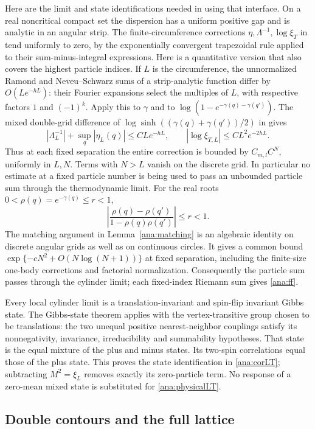 \documentclass[11pt]{article}
\numberwithin{equation}{section}
\theoremstyle{definition}
\begin{document}
Here are the limit and state identifications needed in using that
interface. On a real noncritical compact set the dispersion has a
uniform positive gap and is analytic in an angular strip. The
finite-circumference corrections \(\eta,\Lambda^{-1},\log\xi_T\)
in \cite{BL} tend uniformly to zero, by the exponentially convergent
trapezoidal rule applied to their sum-minus-integral expressions.
Here is a quantitative version that also covers the highest particle
indices. If \(L\) is the circumference, the unnormalized Ramond and
Neveu--Schwarz sums of a strip-analytic function differ by
\(O(Le^{-hL})\): their Fourier expansions select the multiples of
\(L\), with respective factors \(1\) and \((-1)^k\).
Apply this to \(\gamma\) and to
\(\log(1-e^{-\gamma(q)-\gamma(q')})\). The mixed double-grid
difference of \(\log\sinh((\gamma(q)+\gamma(q'))/2)\) in
\cite[(25)]{BL} gives
\[
 |\Lambda_L^{-1}|+\sup_q|\eta_L(q)|\le CLe^{-hL},\qquad
 |\log\xi_{T,L}|\le CL^2e^{-2hL}.
\]
Thus at each fixed separation the entire correction is bounded by
\(C_{m,l}C^N\), uniformly in \(L,N\). Terms with \(N>L\)
vanish on the discrete grid. In particular no estimate at a fixed
particle number is being used to pass an unbounded particle sum
through the thermodynamic limit.
For the real roots \(0<\rho(q)=e^{-\gamma(q)}\le r<1\),
\[
 \left|\frac{\rho(q)-\rho(q')}{1-\rho(q)\rho(q')}\right|\le r<1.
\]
The matching argument in Lemma~\ref{ana:matching} is an algebraic
identity on discrete angular grids as well as on continuous circles.
It gives a common bound
\(\exp\{-cN^2+O(N\log(N+1))\}\) at fixed separation, including
the finite-size one-body corrections and factorial normalization.
Consequently the particle sum passes through the cylinder limit;
each fixed-index Riemann sum gives \eqref{ana:ff}.

Every local cylinder limit is a translation-invariant and spin-flip
invariant Gibbs state. The Gibbs-state theorem
\cite[Theorem 1]{Raoufi} applies with the vertex-transitive group
chosen to be translations: the two unequal positive nearest-neighbor
couplings satisfy its nonnegativity, invariance, irreducibility and
summability hypotheses. That state is the equal mixture of the plus
and minus states. Its two-spin correlations equal those of the plus
state. This proves the state identification in \eqref{ana:corLT};
subtracting \(M^2=\xi_L\) removes exactly its zero-particle term.
No response of a zero-mean mixed state is substituted for
\eqref{ana:physicalLT}.

\subsection{Double contours and the full lattice}
\label{ana:double}
\end{document}
